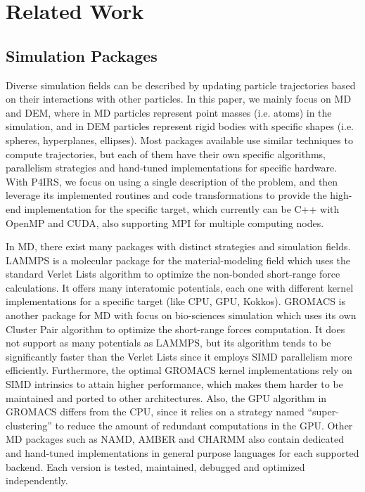 \documentclass[preprint,12pt]{elsarticle}
\begin{document}
\section{Related Work}
\label{sec:related_work}

\subsection{Simulation Packages}
\label{sec:packages}

Diverse simulation fields can be described by updating particle trajectories based on their interactions with other particles.
In this paper, we mainly focus on MD and DEM, where in MD particles represent point masses (i.e. atoms) in the simulation, and in DEM particles represent rigid bodies with specific shapes (i.e. spheres, hyperplanes, ellipses).
Most packages available use similar techniques to compute trajectories, but each of them have their own specific algorithms, parallelism strategies and hand-tuned implementations for specific hardware.
With P4IRS, we focus on using a single description of the problem, and then leverage its implemented routines and code transformations to provide the high-end implementation for the specific target, which currently can be C++ with OpenMP and CUDA, also supporting MPI for multiple computing nodes.

In MD, there exist many packages with distinct strategies and simulation fields.
LAMMPS is a molecular package for the material-modeling field which uses the standard Verlet Lists algorithm to optimize the non-bonded short-range force calculations.
It offers many interatomic potentials, each one with different kernel implementations for a specific target (like CPU, GPU, Kokkos).
GROMACS is another package for MD with focus on bio-sciences simulation which uses its own Cluster Pair algorithm to optimize the short-range forces computation.
It does not support as many potentials as LAMMPS, but its algorithm tends to be significantly faster than the Verlet Lists since it employs SIMD parallelism more efficiently.
Furthermore, the optimal GROMACS kernel implementations rely on SIMD intrinsics to attain higher performance, which makes them harder to be maintained and ported to other architectures.
Also, the GPU algorithm in GROMACS differs from the CPU, since it relies on a strategy named ``super-clustering'' to reduce the amount of redundant computations in the GPU.
Other MD packages such as NAMD, AMBER and CHARMM also contain dedicated and hand-tuned implementations in general purpose languages for each supported backend.
Each version is tested, maintained, debugged and optimized independently.
\end{document}
